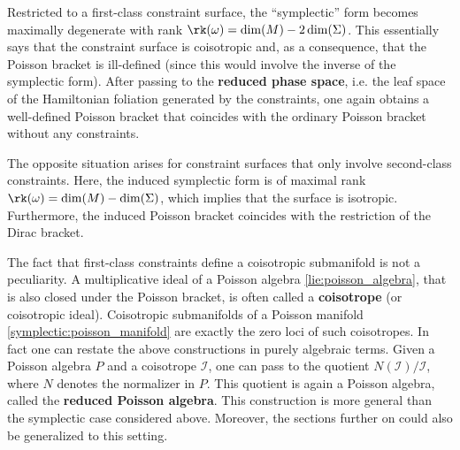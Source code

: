 
    \begin{property}
        Restricted to a first-class constraint surface, the ``symplectic'' form becomes maximally degenerate with rank $\rk(\omega) = \dim(M) - 2\dim(\Sigma)$. This essentially says that the constraint surface is coisotropic and, as a consequence, that the Poisson bracket is ill-defined (since this would involve the inverse of the symplectic form). After passing to the \textbf{reduced phase space}, i.e. the leaf space of the Hamiltonian foliation generated by the constraints, one again obtains a well-defined Poisson bracket that coincides with the ordinary Poisson bracket without any constraints.

        The opposite situation arises for constraint surfaces that only involve second-class constraints. Here, the induced symplectic form is of maximal rank $\rk(\omega) = \dim(M) - \dim(\Sigma)$, which implies that the surface is isotropic. Furthermore, the induced Poisson bracket coincides with the restriction of the Dirac bracket.
    \end{property}
    \begin{remark}
        The fact that first-class constraints define a coisotropic submanifold is not a peculiarity. A multiplicative ideal of a Poisson algebra \ref{lie:poisson_algebra}, that is also closed under the Poisson bracket, is often called a \textbf{coisotrope} (or coisotropic ideal). Coisotropic submanifolds of a Poisson manifold  \ref{symplectic:poisson_manifold} are exactly the zero loci of such coisotropes. In fact one can restate the above constructions in purely algebraic terms. Given a Poisson algebra $P$ and a coisotrope $\mathcal{I}$, one can pass to the quotient $N(\mathcal{I})/\mathcal{I}$, where $N$ denotes the normalizer in $P$. This quotient is again a Poisson algebra, called the \textbf{reduced Poisson algebra}. This construction is more general than the symplectic case considered above. Moreover, the sections further on could also be generalized to this setting.
    \end{remark}

